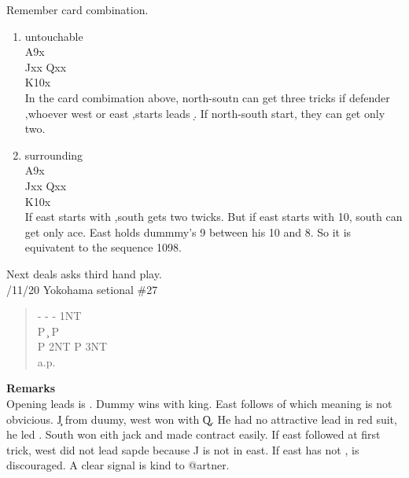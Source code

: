Remember card combination.\\
\begin{enumerate}
\item{ untouchable\\
\qquad \qquad \s A9x\\
\s Jxx \qquad  \qquad  \s Qxx\\
\qquad \qquad \s K10x\\

In the card combimation above, north-soutn can get three
tricks if defender ,whoever west or east ,starts leads \d.
If north-south start, they can get only two.
}
\item{ surrounding\\
\qquad \qquad \s A9x\\
\s Jxx \qquad \qquad \s Qxx\\
\qquad \qquad \s K10x\\
If east starts with ,south gets two twicks. But
if east starts with 10, south can get only ace.
East holds dummmy's 9 between his 10 and 8. So
it is equivatent to  the sequence 1098. 
}
\end{enumerate}

\vspace{0.5cm}
Next deals asks third hand play.\\

/11/20 Yokohama setional \#27
\begin{quote}
%
  {}%
  {}
  {}%
  {}%
\end{quote}
\begin{quote}
\begin{bidding}
-  \> -  \> -  \> 1NT \\
P \c \> P \h \\
P \> 2NT \> P \> 3NT \\
a.p.
\end{bidding}
\end{quote}

{\bf Remarks}\\


Opening leads is . Dummy wins with king. East follows 
of which meaning is not obvicious.
\c J from duumy, west won with \c Q. He had no attractive lead in red suit,
he led . South won eith jack and made contract easily. If east followed 
 at first trick, west did not lead sapde because \s J is not in east.
If east has not ,  is discouraged.  A clear signal is kind to @artner.

